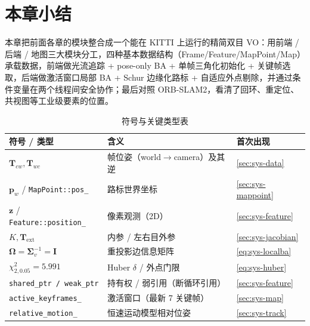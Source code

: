 \section*{本章小结}

本章把前面各章的模块整合成一个能在 KITTI 上运行的精简双目 VO：用前端 / 后端 / 地图三大模块分工，四种基本数据结构（Frame/Feature/MapPoint/Map）承载数据，前端做光流追踪 + pose-only BA + 单帧三角化初始化 + 关键帧选取，后端做激活窗口局部 BA + Schur 边缘化路标 + 自适应外点剔除，并通过条件变量在两个线程间安全协作；最后对照 ORB-SLAM2，看清了回环、重定位、共视图等工业级要素的位置。

\begin{table}[H]\centering\small
\caption{符号与关键类型表}
\begin{tabular}{lll}
\toprule
符号 / 类型 & 含义 & 首次出现 \\
\midrule
$\mathbf{T}_{cw},\mathbf{T}_{wc}$ & 帧位姿（world$\to$camera）及其逆 & \cref{sec:sys-data} \\
$\mathbf{p}_w$ / \texttt{MapPoint::pos\_} & 路标世界坐标 & \cref{sec:sys-mappoint} \\
$\mathbf{z}$ / \texttt{Feature::position\_} & 像素观测（2D） & \cref{sec:sys-feature} \\
$K,\mathbf{T}_{\mathrm{ext}}$ & 内参 / 左右目外参 & \cref{sec:sys-jacobian} \\
$\boldsymbol\Omega=\boldsymbol\Sigma_v^{-1}=\mathbf{I}$ & 重投影边信息矩阵 & \cref{eq:sys-localba} \\
$\chi^2_{2,0.05}=5.991$ & Huber $\delta$ / 外点门限 & \cref{eq:sys-huber} \\
\texttt{shared\_ptr / weak\_ptr} & 持有权 / 弱引用（断循环引用） & \cref{sec:sys-feature} \\
\texttt{active\_keyframes\_} & 激活窗口（最新 7 关键帧） & \cref{sec:sys-map} \\
\texttt{relative\_motion\_} & 恒速运动模型相对位姿 & \cref{sec:sys-track} \\
\bottomrule
\end{tabular}
\end{table}

